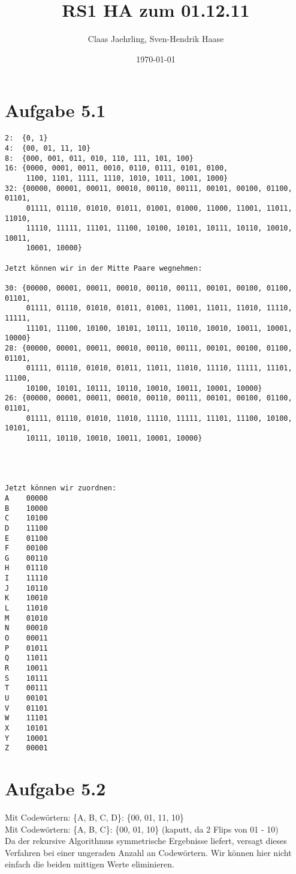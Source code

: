 \documentclass[12pt]{article}
\author{Claas Jaehrling, Sven-Hendrik Haase}
\title{RS1 HA zum 01.12.11}
\date{\today}
\begin{document}
\setcounter{secnumdepth}{0}
\maketitle

\section{Aufgabe 5.1}
\begin{verbatim}
2:  {0, 1}
4:  {00, 01, 11, 10}
8:  {000, 001, 011, 010, 110, 111, 101, 100}
16: {0000, 0001, 0011, 0010, 0110, 0111, 0101, 0100,
     1100, 1101, 1111, 1110, 1010, 1011, 1001, 1000}
32: {00000, 00001, 00011, 00010, 00110, 00111, 00101, 00100, 01100, 01101,
     01111, 01110, 01010, 01011, 01001, 01000, 11000, 11001, 11011, 11010,
     11110, 11111, 11101, 11100, 10100, 10101, 10111, 10110, 10010, 10011,
     10001, 10000}

Jetzt können wir in der Mitte Paare wegnehmen:

30: {00000, 00001, 00011, 00010, 00110, 00111, 00101, 00100, 01100, 01101, 
     01111, 01110, 01010, 01011, 01001, 11001, 11011, 11010, 11110, 11111, 
     11101, 11100, 10100, 10101, 10111, 10110, 10010, 10011, 10001, 10000}
28: {00000, 00001, 00011, 00010, 00110, 00111, 00101, 00100, 01100, 01101,
     01111, 01110, 01010, 01011, 11011, 11010, 11110, 11111, 11101, 11100,
     10100, 10101, 10111, 10110, 10010, 10011, 10001, 10000}
26: {00000, 00001, 00011, 00010, 00110, 00111, 00101, 00100, 01100, 01101,
     01111, 01110, 01010, 11010, 11110, 11111, 11101, 11100, 10100, 10101,
     10111, 10110, 10010, 10011, 10001, 10000}




Jetzt können wir zuordnen:
A    00000
B    10000
C    10100
D    11100
E    01100
F    00100
G    00110
H    01110
I    11110
J    10110
K    10010
L    11010
M    01010
N    00010
O    00011
P    01011
Q    11011
R    10011
S    10111
T    00111
U    00101
V    01101
W    11101
X    10101
Y    10001
Z    00001
\end{verbatim}
 

\section{Aufgabe 5.2}
Mit Codewörtern: \{A, B, C, D\}: \{00, 01, 11, 10\} \\
Mit Codewörtern: \{A, B, C\}: \{00, 01, 10\} (kaputt, da 2 Flips von 01 - 10) \\
Da der rekursive Algorithmus symmetrische Ergebnisse liefert, versagt dieses Verfahren bei einer ungeraden Anzahl an Codewörtern. Wir können hier nicht einfach die beiden mittigen Werte eliminieren.
\end{document}
